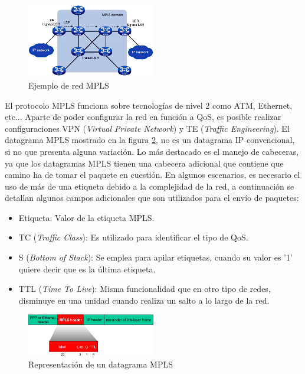 		   \begin{figure}[H]
			\centering
			\includegraphics[width=0.5\textwidth]{img/mplsArch.png}
			\caption{Ejemplo de red MPLS}
			\label{mpls}
		\end{figure}
		 El protocolo MPLS funciona sobre tecnologías de nivel 2 como ATM, Ethernet, etc... Aparte de poder configurar la red en función a QoS, es posible realizar configuraciones VPN (\textit{Virtual Private Network}) y TE (\textit{Traffic Engineering}). El datagrama MPLS mostrado en la figura \ref{mplsData}, no es un datagrama IP convencional, si no que presenta alguna variación. Lo más destacado es el manejo de cabeceras, ya que los datagramas MPLS tienen una cabecera adicional que contiene que camino ha de tomar el paquete en cuestión. En algunos escenarios, es necesario el uso de más de una etiqueta debido a la complejidad de la red, a continuación se detallan algunos campos adicionales que son utilizados para el envío de paquetes:
		 \begin{itemize}
		    \item Etiqueta: Valor de la etiqueta MPLS.
		     \item TC (\textit{Traffic Class}): Es utilizado para identificar el tipo de QoS.
		     \item S (\textit{Bottom of Stack}): Se emplea para apilar etiquetas, cuando su valor es '1' quiere decir que es la última etiqueta.
		     \item TTL (\textit{Time To Live}): Misma funcionalidad que en otro tipo de redes, disminuye en una unidad cuando realiza un salto a lo largo de la red.
		 \end{itemize}
		 
		   \begin{figure}[H]
			\centering
			\includegraphics[width=0.5\textwidth]{img/mplsData.png}
			\caption{Representación de un datagrama MPLS}
			\label{mplsData}
		\end{figure}
		
